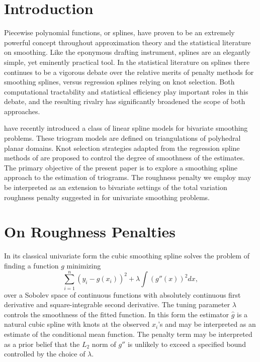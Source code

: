 \pagestyle{myheadings}

\section{Introduction}

Piecewise polynomial functions, or splines, have proven to be an extremely 
powerful concept throughout approximation theory and the statistical
literature on smoothing.  Like the eponymous drafting instrument, splines are
an elegantly simple, yet eminently practical tool.
In the statistical literature on splines
there continues to be a vigorous debate over the 
relative merits of penalty methods for smoothing splines, versus 
regression splines relying on knot selection.  
Both computational tractability and statistical efficiency play important
roles in this debate, and the resulting rivalry has significantly
broadened the scope of both approaches.

 have recently introduced
a class of linear spline models for bivariate smoothing problems.
These triogram  models are defined on triangulations of polyhedral
planar domains.  Knot selection strategies adapted from the
regression spline methods of 
are proposed to control the degree of smoothness of the estimates.
The primary objective of the present paper is  to explore a
smoothing spline approach to the estimation of triograms.  The roughness
penalty we employ may be interpreted as an extension to bivariate settings
of the total variation roughness penalty suggested in  
for univariate smoothing problems.


\section{On Roughness Penalties}

In its classical univariate form the cubic smoothing spline solves
the problem of finding a function $g$ minimizing
\[
\sum_{i=1}^n (y_i - g(x_i))^2 + 
\lambda \int (g''(x))^2 dx,
\]
over a Sobolev space  of continuous functions  with
absolutely continuous first derivative and square-integrable second
derivative. The tuning parameter $\lambda$ controls the smoothness of
the fitted function. In this form the estimator $\hat g $ is
a natural cubic spline with knots at the observed $x_i$'s and may be
interpreted as an estimate of the conditional mean function. The
penalty term may be interpreted as
a prior belief that the $L_2$ norm of $g '' $ is unlikely
to exceed a specified bound controlled by the choice of $\lambda$.

